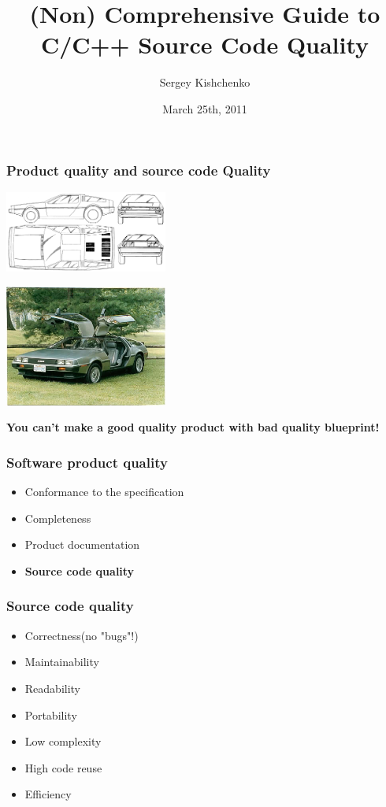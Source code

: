 \documentclass{beamer}
\title{(Non) Comprehensive Guide to C/C++ Source Code Quality}
\author{Sergey Kishchenko}
\date{March 25th, 2011}
\institute{Quickoffice}
\begin{document}
\frame{\titlepage}
\begin{frame} 
\frametitle{Product quality and source code Quality}
\begin{multicols}{2}

\includegraphics[width=0.4\textwidth]{img/delorean-blueprint}
\columnbreak
{}

\includegraphics[width=0.4\textwidth]{img/delorean}
\end{multicols}
\begin{center}
\textbf{You can't make a good quality product with bad quality blueprint!}
\end{center}
\end{frame} 

\begin{frame}
\frametitle{Software product quality}
\begin{itemize}
\item Conformance to the specification
\item Completeness
\item Product documentation
\item \textbf{Source code quality}
\end{itemize}
\end{frame}

\begin{frame}
\frametitle{Source code quality}
\begin{itemize}
\item Correctness(no "bugs"!)
\item Maintainability
\item Readability
\item Portability
\item Low complexity
\item High code reuse
\item Efficiency
\end{itemize}
\end{frame}
\end{document}
